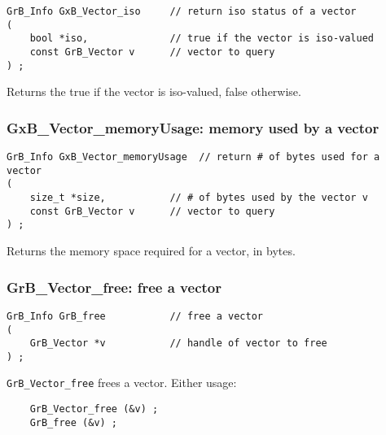 \documentclass[12pt]{article}
\begin{document}
\begin{mdframed}[userdefinedwidth=6in]
{\footnotesize
\begin{verbatim}
GrB_Info GxB_Vector_iso     // return iso status of a vector
(
    bool *iso,              // true if the vector is iso-valued
    const GrB_Vector v      // vector to query
) ;
\end{verbatim} } \end{mdframed}

Returns the true if the vector is iso-valued, false otherwise.

\newpage
\subsubsection{{\sf GxB\_Vector\_memoryUsage:} memory used by a vector}
\label{vector_memusage}

\begin{mdframed}[userdefinedwidth=6in]
{\footnotesize
\begin{verbatim}
GrB_Info GxB_Vector_memoryUsage  // return # of bytes used for a vector
(
    size_t *size,           // # of bytes used by the vector v
    const GrB_Vector v      // vector to query
) ;
\end{verbatim} } \end{mdframed}

Returns the memory space required for a vector, in bytes.

\subsubsection{{\sf GrB\_Vector\_free:}          free a vector}
\label{vector_free}

\begin{mdframed}[userdefinedwidth=6in]
{\footnotesize
\begin{verbatim}
GrB_Info GrB_free           // free a vector
(
    GrB_Vector *v           // handle of vector to free
) ;
\end{verbatim}
} \end{mdframed}

\verb'GrB_Vector_free' frees a vector.  Either usage:

    {\small
    \begin{verbatim}
    GrB_Vector_free (&v) ;
    GrB_free (&v) ; \end{verbatim}}
\end{document}
